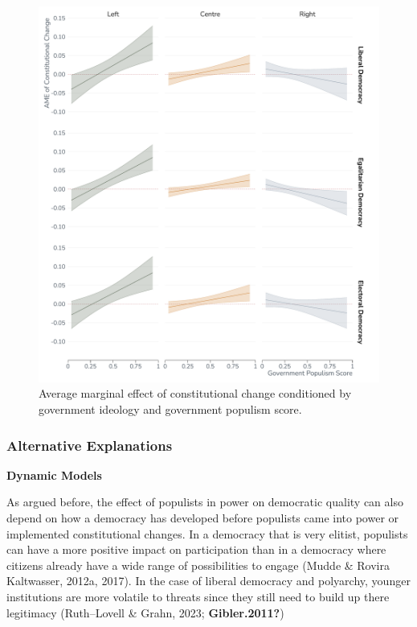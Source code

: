 \documentclass[
  abstract]{article}
\begin{document}
\begin{figure}

{\centering \includegraphics{results/graphs/change_effect.pdf}

}

\caption{\label{fig-interaction}Average marginal effect of
constitutional change conditioned by government ideology and government
populism score.}

\end{figure}

\hypertarget{alternative-explanations}{%
\subsubsection{Alternative
Explanations}\label{alternative-explanations}}

\textbf{Dynamic Models}

As argued before, the effect of populists in power on democratic quality
can also depend on how a democracy has developed before populists came
into power or implemented constitutional changes. In a democracy that is
very elitist, populists can have a more positive impact on participation
than in a democracy where citizens already have a wide range of
possibilities to engage (Mudde \& Rovira Kaltwasser, 2012a, 2017). In
the case of liberal democracy and polyarchy, younger institutions are
more volatile to threats since they still need to build up there
legitimacy (Ruth--Lovell \& Grahn, 2023; \textbf{Gibler.2011?})
\end{document}
